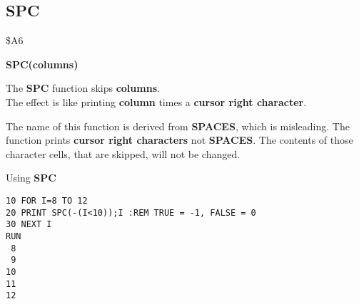 
\newpage
\subsection{SPC}
\begin{description}[leftmargin=2cm,style=nextline]
\item [Token:] \$A6
\item [Format:] {\bf SPC(columns)}
\item [Usage:] The {\bf SPC} function skips {\bf columns}. \\
               The effect is like printing {\bf column}
               times a {\bf cursor right character}.

\item [Remarks:] The name of this function is derived from
                 {\bf SPACES}, which is misleading.
                 The function prints {\bf cursor right characters}
                 not {\bf SPACES}. The contents of those character
                 cells, that are skipped, will not be changed.

\item [Example:] Using {\bf SPC}
\begin{tcolorbox}[colback=black,coltext=white]
\verbatimfont{\codefont}
\begin{verbatim}
10 FOR I=8 TO 12
20 PRINT SPC(-(I<10));I :REM TRUE = -1, FALSE = 0
30 NEXT I
RUN
 8
 9
10
11
12
\end{verbatim}
\end{tcolorbox}
\end{description}


\newpage
